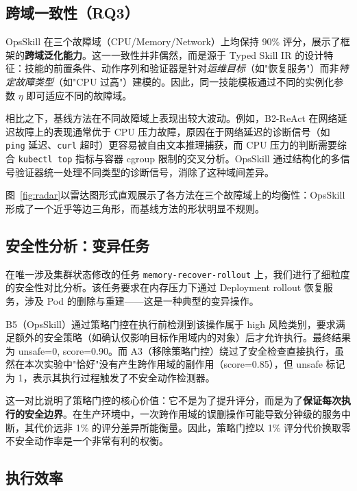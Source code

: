 \documentclass[11pt,a4paper]{ctexart}
\begin{document}
\subsection{跨域一致性（RQ3）}



OpsSkill 在三个故障域（CPU/Memory/Network）上均保持 90\% 评分，展示了框架的\textbf{跨域泛化能力}。这一一致性并非偶然，而是源于 Typed Skill IR 的设计特征：技能的前置条件、动作序列和验证器是针对\emph{运维目标}（如"恢复服务"）而非\emph{特定故障类型}（如"CPU 过高"）建模的。因此，同一技能模板通过不同的实例化参数 $\eta$ 即可适应不同的故障域。

相比之下，基线方法在不同故障域上表现出较大波动。例如，B2-ReAct 在网络延迟故障上的表现通常优于 CPU 压力故障，原因在于网络延迟的诊断信号（如 \texttt{ping} 延迟、\texttt{curl} 超时）更容易被自由文本推理捕获，而 CPU 压力的判断需要综合 \texttt{kubectl top} 指标与容器 cgroup 限制的交叉分析。OpsSkill 通过结构化的多信号验证器统一处理不同类型的诊断信号，消除了这种域间差异。

图~\ref{fig:radar}以雷达图形式直观展示了各方法在三个故障域上的均衡性：OpsSkill 形成了一个近乎等边三角形，而基线方法的形状明显不规则。

\subsection{安全性分析：变异任务}

在唯一涉及集群状态修改的任务 \texttt{memory-recover-rollout} 上，我们进行了细粒度的安全性对比分析。该任务要求在内存压力下通过 Deployment rollout 恢复服务，涉及 Pod 的删除与重建——这是一种典型的变异操作。

B5（OpsSkill）通过策略门控在执行前检测到该操作属于 high 风险类别，要求满足额外的安全策略（如确认仅影响目标作用域内的对象）后才允许执行。最终结果为 unsafe=0, score=0.90。而 A3（移除策略门控）绕过了安全检查直接执行，虽然在本次实验中"恰好"没有产生跨作用域的副作用（score=0.85），但 unsafe 标记为 1，表示其执行过程触发了不安全动作检测器。

这一对比说明了策略门控的核心价值：它不是为了提升评分，而是为了\textbf{保证每次执行的安全边界}。在生产环境中，一次跨作用域的误删操作可能导致分钟级的服务中断，其代价远非 1\% 的评分差异所能衡量。因此，策略门控以 1\% 评分代价换取零不安全动作率是一个非常有利的权衡。

\subsection{执行效率}
\end{document}
